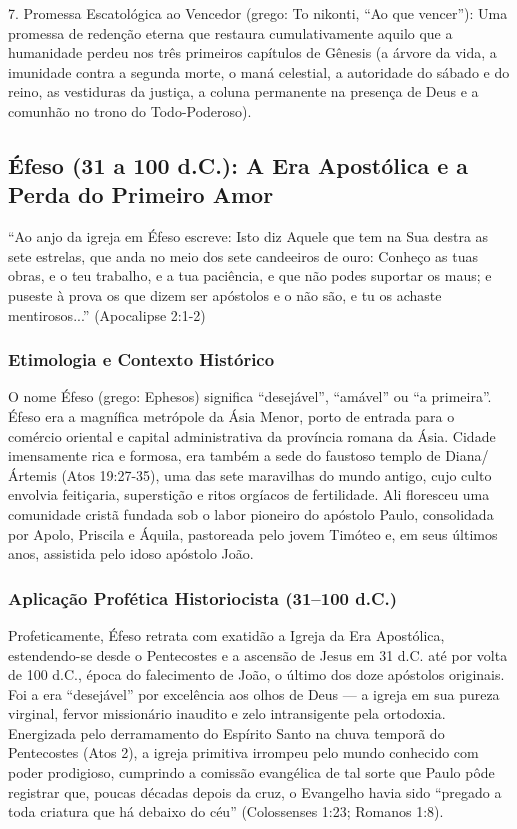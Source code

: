 \documentclass[11pt,a4paper,openany]{book}
\begin{document}
7. Promessa Escatológica ao Vencedor (grego: To nikonti, ``Ao que vencer''): Uma promessa de redenção eterna que restaura cumulativamente aquilo que a humanidade perdeu nos três primeiros capítulos de Gênesis (a árvore da vida, a imunidade contra a segunda morte, o maná celestial, a autoridade do sábado e do reino, as vestiduras da justiça, a coluna permanente na presença de Deus e a comunhão no trono do Todo-Poderoso).



\subsection{Éfeso (31 a 100 d.C.): A Era Apostólica e a Perda do Primeiro Amor}


``Ao anjo da igreja em Éfeso escreve: Isto diz Aquele que tem na Sua destra as sete estrelas, que anda no meio dos sete candeeiros de ouro: Conheço as tuas obras, e o teu trabalho, e a tua paciência, e que não podes suportar os maus; e puseste à prova os que dizem ser apóstolos e o não são, e tu os achaste mentirosos...'' (Apocalipse 2:1-2)


\subsubsection*{Etimologia e Contexto Histórico}
O nome Éfeso (grego: Ephesos) significa ``desejável'', ``amável'' ou ``a primeira''. Éfeso era a magnífica metrópole da Ásia Menor, porto de entrada para o comércio oriental e capital administrativa da província romana da Ásia. Cidade imensamente rica e formosa, era também a sede do faustoso templo de Diana/Ártemis (Atos 19:27-35), uma das sete maravilhas do mundo antigo, cujo culto envolvia feitiçaria, superstição e ritos orgíacos de fertilidade. Ali floresceu uma comunidade cristã fundada sob o labor pioneiro do apóstolo Paulo, consolidada por Apolo, Priscila e Áquila, pastoreada pelo jovem Timóteo e, em seus últimos anos, assistida pelo idoso apóstolo João.


\subsubsection*{Aplicação Profética Historiocista (31–100 d.C.)}
Profeticamente, Éfeso retrata com exatidão a Igreja da Era Apostólica, estendendo-se desde o Pentecostes e a ascensão de Jesus em 31 d.C. até por volta de 100 d.C., época do falecimento de João, o último dos doze apóstolos originais. Foi a era ``desejável'' por excelência aos olhos de Deus — a igreja em sua pureza virginal, fervor missionário inaudito e zelo intransigente pela ortodoxia. Energizada pelo derramamento do Espírito Santo na chuva temporã do Pentecostes (Atos 2), a igreja primitiva irrompeu pelo mundo conhecido com poder prodigioso, cumprindo a comissão evangélica de tal sorte que Paulo pôde registrar que, poucas décadas depois da cruz, o Evangelho havia sido ``pregado a toda criatura que há debaixo do céu'' (Colossenses 1:23; Romanos 1:8).
\end{document}
